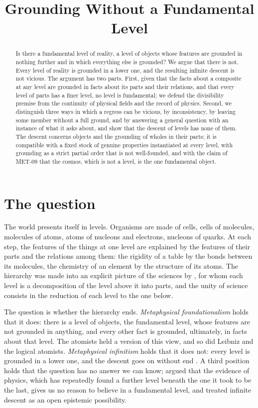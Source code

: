 \documentclass{situationist-preprint}
\title{Grounding Without a Fundamental Level}
\begin{document}
\maketitle

\begin{abstract}
Is there a fundamental level of reality, a level of objects whose features are grounded in nothing further and in which everything else is grounded? We argue that there is not. Every level of reality is grounded in a lower one, and the resulting infinite descent is not vicious. The argument has two parts. First, given that the facts about a composite at any level are grounded in facts about its parts and their relations, and that every level of parts has a finer level, no level is fundamental; we defend the divisibility premise from the continuity of physical fields and the record of physics. Second, we distinguish three ways in which a regress can be vicious, by inconsistency, by leaving some member without a full ground, and by answering a general question with an instance of what it asks about, and show that the descent of levels has none of them. The descent concerns objects and the grounding of wholes in their parts; it is compatible with a fixed stock of genuine properties instantiated at every level, with grounding as a strict partial order that is not well-founded, and with the claim of MET-09 that the cosmos, which is not a level, is the one fundamental object.
\end{abstract}

\section{The question}\label{s:question}

The world presents itself in levels. Organisms are made of cells, cells of molecules, molecules of atoms, atoms of nucleons and electrons, nucleons of quarks. At each step, the features of the things at one level are explained by the features of their parts and the relations among them: the rigidity of a table by the bonds between its molecules, the chemistry of an element by the structure of its atoms. The hierarchy was made into an explicit picture of the sciences by \citet{OppenheimPutnam1958}, for whom each level is a decomposition of the level above it into parts, and the unity of science consists in the reduction of each level to the one below.

The question is whether the hierarchy ends. \emph{Metaphysical foundationalism} holds that it does: there is a level of objects, the fundamental level, whose features are not grounded in anything, and every other fact is grounded, ultimately, in facts about that level. The atomists held a version of this view, and so did Leibniz and the logical atomists. \emph{Metaphysical infinitism} holds that it does not: every level is grounded in a lower one, and the descent goes on without end \citep[see][]{Morganti2014}. A third position holds that the question has no answer we can know; \citet{Schaffer2003} argued that the evidence of physics, which has repeatedly found a further level beneath the one it took to be the last, gives us no reason to believe in a fundamental level, and treated infinite descent as an open epistemic possibility.
\end{document}
